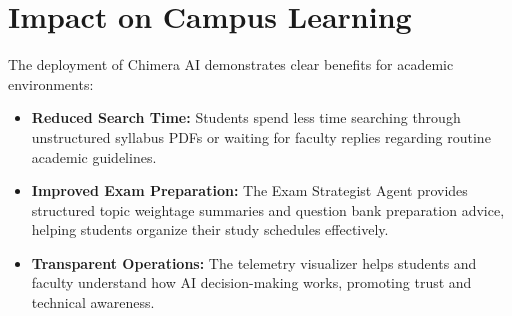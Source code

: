 \section{Impact on Campus Learning}
The deployment of Chimera AI demonstrates clear benefits for academic environments:
\begin{itemize}
    \item \textbf{Reduced Search Time:} Students spend less time searching through unstructured syllabus PDFs or waiting for faculty replies regarding routine academic guidelines.
    \item \textbf{Improved Exam Preparation:} The Exam Strategist Agent provides structured topic weightage summaries and question bank preparation advice, helping students organize their study schedules effectively.
    \item \textbf{Transparent Operations:} The telemetry visualizer helps students and faculty understand how AI decision-making works, promoting trust and technical awareness.
\end{itemize}
